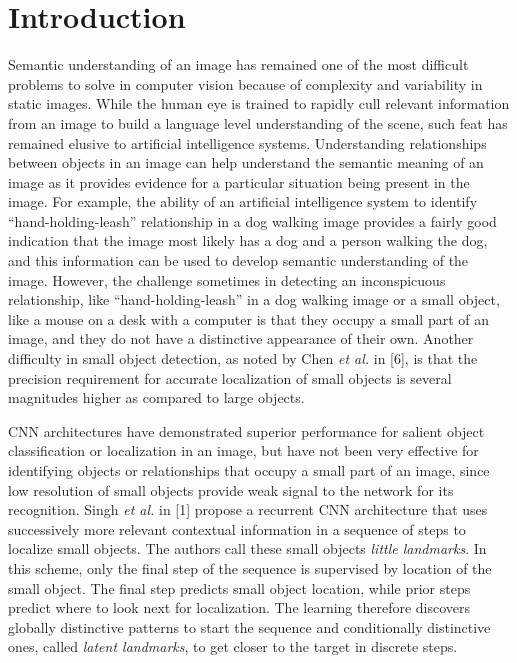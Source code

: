 \documentclass [11pt,letterpaper ,twoside ,openany ]{report}
\begin{document}
    \chapter{Introduction}
    \doublespacing
    Semantic understanding of an image has remained one of the most difficult problems to solve in computer vision because of complexity and variability in static images. While the human eye is trained to rapidly cull relevant information from an image to build a language level understanding of the scene, such feat has remained elusive to artificial intelligence systems. Understanding relationships between objects in an image can help understand the semantic meaning of an image as it provides evidence for a particular situation being present in the image. For example, the ability of an artificial intelligence system to identify ``hand-holding-leash'' relationship in a dog walking image provides a fairly good indication that the image most likely has a dog and a person walking the dog, and this information can be used to develop semantic understanding of the image. However, the challenge sometimes in detecting an inconspicuous relationship, like ``hand-holding-leash'' in a dog walking image or a small object, like a mouse on a desk with a computer is that they occupy a small part of an image, and they do not have a distinctive appearance of their own. Another difficulty in small object detection, as noted by Chen \textit{et al.} in [6], is that the precision requirement for accurate localization of small objects is several magnitudes higher as compared to large objects. 
    
    CNN architectures have demonstrated superior performance for salient object classification or localization in an image, but have not been very effective for identifying objects or relationships that occupy a small part of an image, since low resolution of small objects provide weak signal to the network for its recognition. Singh \textit{et al.} in [1] propose a recurrent CNN architecture that uses successively more relevant contextual information in a sequence of steps to localize small objects. The authors call these small objects \textit {little landmarks}. In this scheme, only the final step of the sequence is supervised by location of the small object. The final step predicts small object location, while prior steps predict where to look next for localization. The learning therefore discovers globally distinctive patterns to start the sequence and conditionally distinctive ones, called \textit {latent landmarks}, to get closer to the target in discrete steps.
\end{document}
